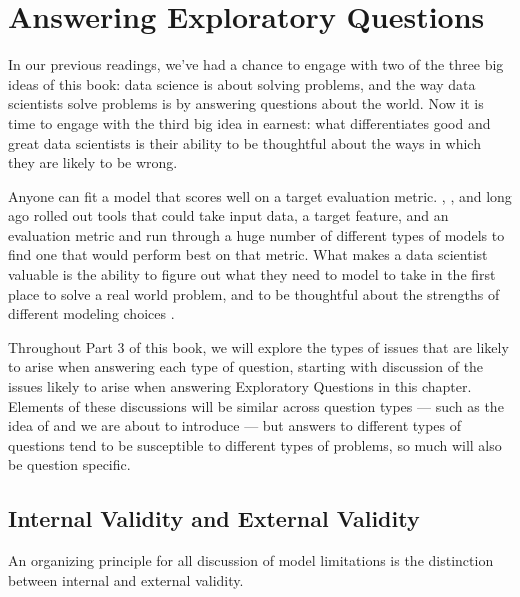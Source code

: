 \documentclass[letterpaper,10pt,english]{jupyterBook}
\begin{document}
\chapter{Answering Exploratory Questions}
\label{\detokenize{30_questions/15_answering_exploratory_questions:answering-exploratory-questions}}\label{\detokenize{30_questions/15_answering_exploratory_questions::doc}}
\sphinxAtStartPar
In our previous readings, we’ve had a chance to engage with two of the three big ideas of this book: data science is about solving problems, and the way data scientists solve problems is by answering questions about the world. Now it is time to engage with the third big idea in earnest: what differentiates good and great data scientists is their ability to be thoughtful about the ways in which they are likely to be wrong.

\sphinxAtStartPar
Anyone can fit a model that scores well on a target evaluation metric. , , and  long ago rolled out tools that could take input data, a target feature, and an evaluation metric and run through a huge number of different types of models to find one that would perform best on that metric. What makes a data scientist valuable is the ability to figure out what they need to model to take in the first place to solve a real world problem, and to be thoughtful about the strengths  of different modeling choices .

\sphinxAtStartPar
Throughout Part 3 of this book, we will explore the types of issues that are likely to arise when answering each type of question, starting with discussion of the issues likely to arise when answering Exploratory Questions in this chapter. Elements of these discussions will be similar across question types — such as the idea of  and  we are about to introduce — but answers to different types of questions tend to be susceptible to different types of problems, so much will also be question specific.


\section{Internal Validity and External Validity}
\label{\detokenize{30_questions/15_answering_exploratory_questions:internal-validity-and-external-validity}}
\sphinxAtStartPar
An organizing principle for all discussion of model limitations is the distinction between internal and external validity.
\end{document}
